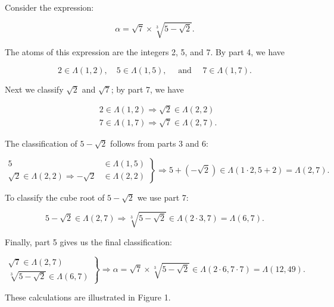 \documentclass[11pt,letterpaper]{article}
\begin{document}
Consider the expression:

\[
\alpha=\sqrt{7} \times \sqrt[3]{5-\sqrt{2}} .
\]

The atoms of this expression are the integers 2, 5, and 7. By part 4, we have

\[
2 \in \Lambda(1,2), \quad 5 \in \Lambda(1,5), \quad \text { and } \quad 7 \in \Lambda(1,7) .
\]

Next we classify $\sqrt{2}$ and $\sqrt{7}$; by part 7, we have

\[
\begin{aligned}
& 2 \in \Lambda(1,2) \Rightarrow \sqrt{2} \in \Lambda(2,2) \\
& 7 \in \Lambda(1,7) \Rightarrow \sqrt{7} \in \Lambda(2,7) .
\end{aligned}
\]

The classification of $5-\sqrt{2}$ follows from parts 3 and 6:

\[
\left.\begin{array}{rl}
5 & \in \Lambda(1,5) \\
\sqrt{2} \in \Lambda(2,2) \Rightarrow-\sqrt{2} & \in \Lambda(2,2)
\end{array}\right\} \Rightarrow 5+(-\sqrt{2}) \in \Lambda(1 \cdot 2,5+2)=\Lambda(2,7) .
\]

To classify the cube root of $5-\sqrt{2}$ we use part 7:

\[
5-\sqrt{2} \in \Lambda(2,7) \Rightarrow \sqrt[3]{5-\sqrt{2}} \in \Lambda(2 \cdot 3,7)=\Lambda(6,7) .
\]

Finally, part 5 gives us the final classification:

\[
\left.\begin{array}{r}
\sqrt{7} \in \Lambda(2,7) \\
\sqrt[3]{5-\sqrt{2}} \in \Lambda(6,7)
\end{array}\right\} \Rightarrow \alpha=\sqrt{7} \times \sqrt[3]{5-\sqrt{2}} \in \Lambda(2 \cdot 6,7 \cdot 7)=\Lambda(12,49) .
\]

These calculations are illustrated in Figure 1.
\end{document}
